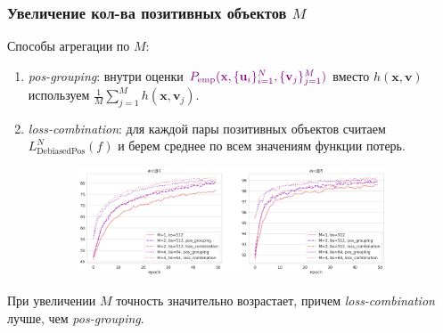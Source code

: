 \documentclass[
	11pt, %
	t, %
        russian
]{beamer}
\begin{document}
\begin{frame}
	\frametitle{Увеличение кол-ва позитивных объектов $M$}
\scriptsize
Способы агрегации по $M$:
\begin{enumerate}
    \item \textit{pos-grouping}: внутри оценки $\color{violet}P_{\text{emp}} (\textbf{x}, \{\textbf{u}_i\}_{i=1}^N, \{\textbf{v}_j\}_{j=1}^M)$ вместо $h(\textbf{x}, \textbf{v})$ используем $\frac{1}{M} \sum \limits_{j=1}^M h(\textbf{x}, \textbf{v}_j)$.
    \item \textit{loss-combination}: для каждой пары позитивных объектов считаем $L_{\text{DebiasedPos}}^N (f)$ и берем среднее по всем значениям функции потерь.


\end{enumerate}

\begin{figure}
\centering
\begin{subfigure}
  \centering
  \includegraphics[width=1\linewidth]{Images/pg_vs_lc.png}
  \label{fig:sub1}
\end{subfigure}
\label{fig:test}
\end{figure}

\scriptsize При увеличении $M$ точность значительно возрастает, причем \textit{loss-combination} лучше, чем \textit{pos-grouping}.
	
\end{frame}

\end{document}
